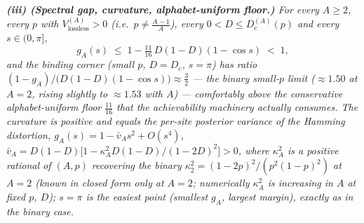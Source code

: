 \documentclass[
]{article}
\begin{document}
\emph{\textbf{(iii) (Spectral gap, curvature, alphabet-uniform floor.)} For
every $A\ge2$, every $p$ with $V_{\mathrm{lossless}}^{(A)}>0$ (i.e.\
$p\ne\tfrac{A-1}A$), every $0<D\le D_c^{(A)}(p)$ and every $s\in(0,\pi]$,}
\[
  g_A(s)\;\le\;1-\tfrac{11}{16}\,D(1-D)(1-\cos s)\;<\;1,
\]
\emph{and the binding corner (small $p$, $D=D_c$, $s=\pi$) has ratio
$(1-g_A)/\bigl(D(1-D)(1-\cos s)\bigr)\approx\tfrac32$ --- the binary small-$p$
limit ($\approx1.50$ at $A=2$, rising slightly to $\approx1.53$ with $A$) ---
comfortably above the conservative alphabet-uniform floor $\tfrac{11}{16}$ that
the achievability machinery actually consumes. The curvature is positive
and equals the per-site posterior variance of the Hamming distortion,
$g_A(s)=1-\bar v_A s^2+O(s^4)$, $\bar v_A=D(1-D)\bigl[1-\kappa_A^2
D(1-D)/(1-2D)^2\bigr]>0$, where $\kappa_A^2$ is a positive rational of
$(A,p)$ recovering the binary $\kappa_2^2=(1-2p)^2/(p^2(1-p)^2)$ at $A=2$
(known in closed form only at $A=2$; numerically $\kappa_A^2$ is increasing
in $A$ at fixed $p$, $D$); $s=\pi$ is the \emph{easiest} point (smallest
$g_A$, largest margin), exactly as in the binary case.}
\end{document}
